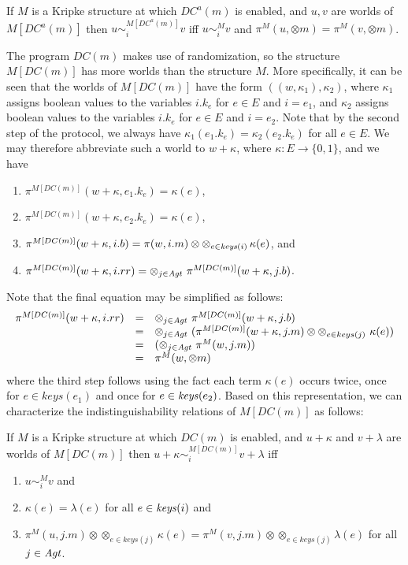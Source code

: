 \documentclass[]{llncs}
\newcommand{\be}{\begin{enumerate}}
\newcommand{\ee}{\end{enumerate}}
\newcommand{\xor}{\otimes}
\newcommand{\keys}{{\it keys}}
\newcommand{\Agt}{{\it Agt}}
\newcommand{\xm}{\xor m}
\begin{document}
\begin{lemma} \label{lem:simdca} 
If $M$ is a Kripke structure at which $DC^a(m)$ is enabled, and $u,v$ are worlds of $M[DC^a(m)]$ then 
$u \sim^{M[DC^a(m)]}_i v$ iff $u\sim^M_i v$ and $\pi^M(u, \xm) = \pi^M(v,\xm)$.
\end{lemma} 


The program $DC(m)$ makes use of randomization, so the structure $M[DC(m)]$ has more worlds than 
the structure $M$. More specifically, it can be seen that the worlds of  $M[DC(m)]$ have the form 
$((w, \kappa_1), \kappa_2)$, where $\kappa_1$ assigns boolean values to the variables 
$i.k_e$ for $e \in E$ and $i = e_1$, and  $\kappa_2$ assigns boolean values to the variables 
$i.k_e$ for $e \in E$ and $i = e_2$. Note that by the second step of the protocol, we always have 
$\kappa_1(e_1.k_e) = \kappa_2(e_2.k_e)$ for all $e\in E$. We may therefore abbreviate such a world to $w+\kappa$, 
where $\kappa: E\rightarrow \{0,1\}$, and 
we have 
\be 
\item $\pi^{M[DC(m)]}(w + \kappa, e_1.k_e) = \kappa(e)$, 
\item $\pi^{M[DC(m)]}(w + \kappa, e_2.k_e) = \kappa(e)$, 
\item $\pi^{M[DC(m)]}(w + \kappa, i.b) = \pi(w,i.m) \xor \xor_{e\in \keys(i)} \, \kappa(e)$, 
and 
\item $\pi^{M[DC(m)]}(w + \kappa, i.rr) = \xor_{j\in \Agt} ~\pi^{M[DC(m)]}(w+ \kappa,j.b)$. 
\ee 
Note that the final equation may be simplified as follows:  
$$
\begin{array}{rcl} 
\pi^{M[DC(m)]}(w+ \kappa,i.rr)  & =  & \xor_{j\in \Agt} ~\pi^{M[DC(m)]}(w+ \kappa,j.b) \\ 
& = &  \xor_{j\in \Agt} ~(\pi^{M[DC(m)]}(w+ \kappa,j.m) \xor \xor_{e\in keys(j)}~ \kappa(e)) \\ 
& = &  (\xor_{j\in \Agt} ~\pi^M(w,j.m))\\ 
& = &  \pi^M (w,\xm)~
\end{array} 
$$ 
where the third step follows using the fact each term $\kappa(e)$ occurs twice, 
once for $e\in keys(e_1)$ and once for $e\in \keys(e_2)$. 
Based on this representation, we can characterize the indistinguishability relations of 
$M[DC(m)]$ as follows: 

\begin{lemma} \label{lem:simdc} 
If $M$ is a Kripke structure at which $DC(m)$ is enabled, and $u+\kappa$ and $v+\lambda$ are worlds of $M[DC(m)]$ then 
$u+\kappa \sim^{M[DC(m)]}_i v+\lambda$ iff 
\be \item $u\sim^M_i v$ and 
\item $\kappa(e) = \lambda(e)$ for all $e\in \keys(i)$ and 
\item $\pi^{M}(u,j.m) \xor \xor_{e\in keys(j)} \kappa(e) = \pi^{M}(v,j.m) \xor \xor_{e\in keys(j)} \lambda(e)$ for all 
$j\in \Agt$. 
\ee 
\end{lemma} 
\end{document}
